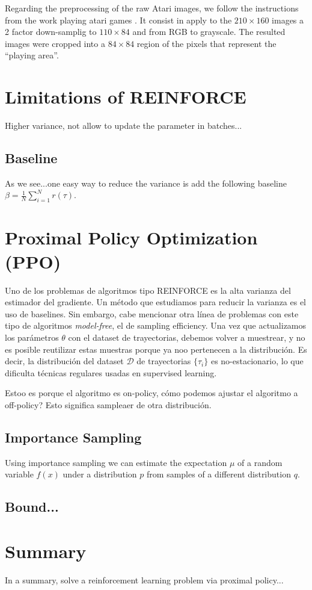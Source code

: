 Regarding the preprocessing of the raw Atari images, we follow the instructions
from the work playing atari games \cite{mnih2013playing}. It consist in
apply to the $210\times 160$ images a 2 factor down-samplig to $110\times 84$
and from RGB to grayscale. The resulted images were cropped into a $84\times84$
region of the pixels that represent the ``playing area''.

\section{Limitations of REINFORCE}

Higher variance, not allow to update the parameter in batches...

\subsection{Baseline}

As we see...one easy way to reduce the variance is add the following
baseline $\beta=\frac{1}{N}\sum_{i=1}^{N} r(\tau)$.

\section{Proximal Policy Optimization (PPO)}

Uno de los problemas de algoritmos tipo REINFORCE es la alta varianza del
estimador del gradiente. Un método que estudiamos para reducir la varianza
es el uso de baselines. Sin embargo, cabe mencionar otra línea de problemas
con este tipo de algoritmos \textit{model-free}, el de sampling efficiency. Una
vez que actualizamos los parámetros $\theta$ con el dataset de trayectorias,
debemos volver a muestrear, y no es posible reutilizar estas muestras porque
ya noo pertenecen a la distribución. Es decir, la distribución del dataset
$\mathcal{D}$ de trayectorias $\{\tau_i\}$ es no-estacionario, lo que dificulta
técnicas regulares usadas en supervised learning.

Estoo es porque el algoritmo es on-policy, cómo podemos ajustar el
algoritmo a off-policy? Esto significa sampleaer de otra distribución.


\subsection{Importance Sampling}


Using importance sampling we can estimate the expectation $\mu$ of a random
variable $f(x)$ under a distribution $p$ from samples of a different 
distribution $q$. 


\subsection{Bound...}

\section{Summary}

In a summary, solve a reinforcement learning problem
via proximal policy...